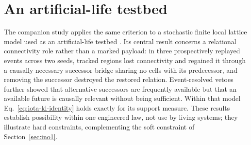 \section{An artificial-life testbed}
\label{sec:testbed}

The companion study applies the same criterion to a stochastic finite local
lattice model used as an artificial-life testbed \citep{Clark2026IotaConstraint}.
Its central result concerns a relational connectivity role rather than a
marked payload: in three prospectively replayed events across two seeds,
tracked regions lost connectivity and regained it through a causally necessary
successor bridge sharing no cells with its predecessor, and removing the
successor destroyed the restored relation. Event-resolved vetoes further showed
that alternative successors are frequently available but that an available
future is causally relevant without being sufficient. Within that model
Eq.~\eqref{eq:iota-kl-identity} holds exactly for its support measure. These
results establish possibility within one engineered law, not use by living
systems; they illustrate hard constraints, complementing the soft constraint of
Section~\ref{sec:ino1}.

